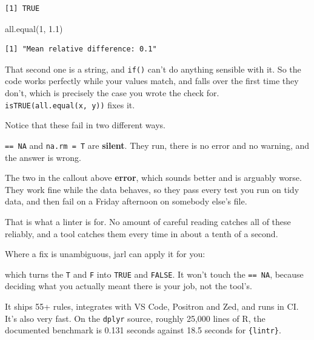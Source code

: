 \documentclass[
  letterpaper,
  justified,
  a4paper]{tufte-book}
\makeatletter
\newenvironment{Shaded}{\begin{snugshade}}{\end{snugshade}}
\newcommand{\AttributeTok}[1]{\textcolor[rgb]{0.40,0.45,0.13}{#1}}
\newcommand{\DecValTok}[1]{\textcolor[rgb]{0.68,0.00,0.00}{#1}}
\newcommand{\ExtensionTok}[1]{\textcolor[rgb]{0.00,0.23,0.31}{#1}}
\newcommand{\FloatTok}[1]{\textcolor[rgb]{0.68,0.00,0.00}{#1}}
\newcommand{\FunctionTok}[1]{\textcolor[rgb]{0.28,0.35,0.67}{#1}}
\newcommand{\NormalTok}[1]{\textcolor[rgb]{0.00,0.23,0.31}{#1}}
\let\rbporigShaded\Shaded
\let\rbporigendShaded\endShaded
\renewenvironment{Shaded}{%
  \begingroup
  \ifdim\linewidth=\rbpbodywidth
    \advance\linewidth by \@tufte@overhang
    \advance\hsize by \@tufte@overhang
    \advance\columnwidth by \@tufte@overhang
  \fi
  \rbporigShaded
}{%
  \rbporigendShaded
  \endgroup
}
\makeatother
\begin{document}
\begin{tcolorbox}
\begin{verbatim}
[1] TRUE
\end{verbatim}

\begin{Shaded}
\begin{Highlighting}[]
\FunctionTok{all.equal}\NormalTok{(}\DecValTok{1}\NormalTok{, }\FloatTok{1.1}\NormalTok{)}
\end{Highlighting}
\end{Shaded}

\begin{verbatim}
[1] "Mean relative difference: 0.1"
\end{verbatim}

That second one is a string, and \texttt{if()} can't do anything
sensible with it. So the code works perfectly while your values match,
and falls over the first time they don't, which is precisely the case
you wrote the check for. \texttt{isTRUE(all.equal(x,\ y))} fixes it.

\end{tcolorbox}

Notice that these fail in two different ways.

\texttt{==\ NA} and \texttt{na.rm\ =\ T} are \textbf{silent}. They run,
there is no error and no warning, and the answer is wrong.

The two in the callout above \textbf{error}, which sounds better and is
arguably worse. They work fine while the data behaves, so they pass
every test you run on tidy data, and then fail on a Friday afternoon on
somebody else's file.

That is what a linter is for. No amount of careful reading catches all
of these reliably, and a tool catches them every time in about a tenth
of a second.

Where a fix is unambiguous, jarl can apply it for you:

\begin{Shaded}
\end{Shaded}

which turns the \texttt{T} and \texttt{F} into \texttt{TRUE} and
\texttt{FALSE}. It won't touch the \texttt{==\ NA}, because deciding
what you actually meant there is your job, not the tool's.

It ships 55+ rules, integrates with VS Code, Positron and Zed, and runs
in CI. It's also very fast. On the \texttt{dplyr} source, roughly 25,000
lines of R, the documented benchmark is 0.131 seconds against 18.5
seconds for \texttt{\{lintr\}}.
\end{document}
